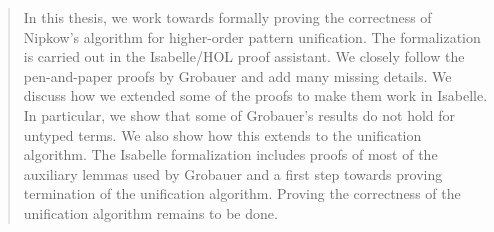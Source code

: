 \begin{abstract}
In this thesis, we work towards formally proving the correctness of Nipkow's algorithm for higher-order pattern unification. The formalization is carried out in the Isabelle/HOL proof assistant. We closely follow the pen-and-paper proofs by Grobauer and add many missing details. We discuss how we extended some of the proofs to make them work in Isabelle. In particular, we show that some of Grobauer's results do not hold for untyped terms. We also show how this extends to the unification algorithm. The Isabelle formalization includes proofs of most of the auxiliary lemmas used by Grobauer and a first step towards proving termination of the unification algorithm. Proving the correctness of the unification algorithm remains to be done.
\end{abstract}
